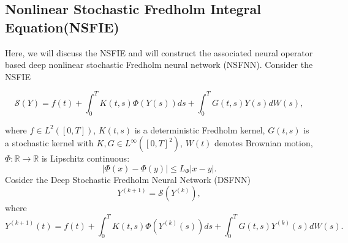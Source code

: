 \documentclass[preprint,12pt,authoryear]{elsarticle}
\begin{document}
\subsection{Nonlinear Stochastic Fredholm Integral Equation(NSFIE)}
Here, we will discuss the NSFIE and will construct the associated neural operator based deep nonlinear stochastic Fredholm neural network (NSFNN). Consider the NSFIE 

\begin{equation}
\mathcal S(Y)=f(t)+\int_0^T K(t,s)\Phi(Y(s))ds
+\int_0^T G(t,s)Y(s)dW(s),
\end{equation}

where $f \in L^2([0,T])$, 
$K(t,s)$ is a deterministic Fredholm kernel, $G(t,s)$ is a stochastic kernel with $K, G \in L^\infty([0,T]^2)$, $W(t)$ denotes Brownian motion, $\Phi: \mathbb{R} \to \mathbb{R}$ is Lipschitz continuous:
\[
|\Phi(x) - \Phi(y)| \le L_\Phi |x-y|.
\] Cosider the Deep Stochastic Fredholm Neural Network (DSFNN)
\begin{equation}
Y^{(k+1)} = \mathcal{S}(Y^{(k)}),
\end{equation}
where 
\begin{equation}
Y^{(k+1)}(t)=f(t)
+\int_0^T K(t,s)\Phi(Y^{(k)}(s))ds
+\int_0^T G(t,s)Y^{(k)}(s)dW(s).
\end{equation}
\end{document}
